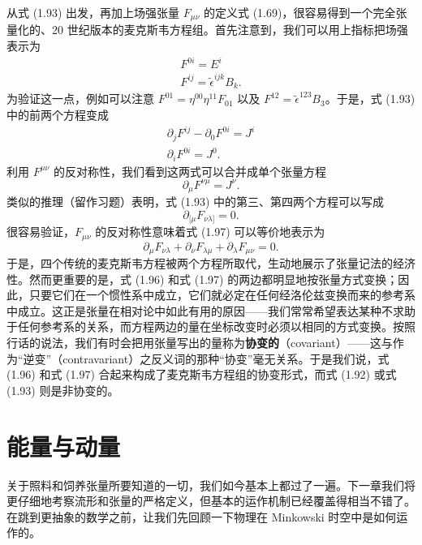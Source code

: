 从式 (1.93) 出发，再加上场强张量 $F_{\mu\nu}$ 的定义式 (1.69)，很容易得到一个完全张量化的、20 世纪版本的麦克斯韦方程组。首先注意到，我们可以用上指标把场强表示为
\begin{equation*}
\begin{gathered}
F^{0i} = E^i\\
F^{ij} = \tilde{\epsilon}^{ijk}B_k.
\end{gathered}
\tag{1.94}
\end{equation*}
为验证这一点，例如可以注意 $F^{01}=\eta^{00}\eta^{11}F_{01}$ 以及 $F^{12}=\tilde{\epsilon}^{123}B_{3}$。于是，式 (1.93) 中的前两个方程变成
\begin{equation*}
\begin{gathered}
\partial_j F^{ij} - \partial_0 F^{0i} = J^i\\
\partial_i F^{0i} = J^0.
\end{gathered}
\tag{1.95}
\end{equation*}
利用 $F^{\mu\nu}$ 的反对称性，我们看到这两式可以合并成单个张量方程
\begin{equation*}
\partial_{\mu}F^{\nu\mu} = J^{\nu}.
\tag{1.96}
\end{equation*}
类似的推理（留作习题）表明，式 (1.93) 中的第三、第四两个方程可以写成
\begin{equation*}
\partial_{[\mu}F_{\nu\lambda]} = 0.
\tag{1.97}
\end{equation*}
很容易验证，$F_{\mu\nu}$ 的反对称性意味着式 (1.97) 可以等价地表示为
\begin{equation*}
\partial_{\mu}F_{\nu\lambda} + \partial_{\nu}F_{\lambda\mu} + \partial_{\lambda}F_{\mu\nu} = 0.
\tag{1.98}
\end{equation*}
于是，四个传统的麦克斯韦方程被两个方程所取代，生动地展示了张量记法的经济性。然而更重要的是，式 (1.96) 和式 (1.97) 的两边都明显地按张量方式变换；因此，只要它们在一个惯性系中成立，它们就必定在任何经洛伦兹变换而来的参考系中成立。这正是张量在相对论中如此有用的原因——我们常常希望表达某种不求助于任何参考系的关系，而方程两边的量在坐标改变时必须以相同的方式变换。按照行话的说法，我们有时会把用张量写出的量称为\textbf{协变的}（covariant）——这与作为“逆变”（contravariant）之反义词的那种“协变”毫无关系。于是我们说，式 (1.96) 和式 (1.97) 合起来构成了麦克斯韦方程组的协变形式，而式 (1.92) 或式 (1.93) 则是非协变的。

\section{能量与动量}

关于照料和饲养张量所要知道的一切，我们如今基本上都过了一遍。下一章我们将更仔细地考察流形和张量的严格定义，但基本的运作机制已经覆盖得相当不错了。在跳到更抽象的数学之前，让我们先回顾一下物理在 Minkowski 时空中是如何运作的。

